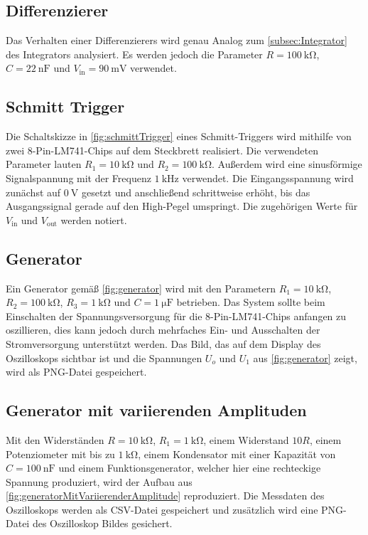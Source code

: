 \subsection{Differenzierer}
\label{subsec:Differenzierer}
Das Verhalten einer Differenzierers wird genau Analog zum \autoref{subsec:Integrator} des Integrators analysiert.
Es werden jedoch die Parameter $R = \qty{100}{\kilo\ohm}$, $ C = \qty{22}{\nano\farad}$ und $V_{\text{in}} = \qty{90}{\milli\volt}$ verwendet.

\subsection{Schmitt Trigger}
\label{subsec:SchmittTrigger}
Die Schaltskizze in \autoref{fig:schmittTrigger} eines Schmitt-Triggers wird mithilfe von zwei 8-Pin-LM741-Chips
auf dem Steckbrett realisiert. Die verwendeten Parameter lauten $R_1 = \qty{10}{\kilo\ohm}$ und $R_2 = \qty{100}{\kilo\ohm}$.
Außerdem wird eine sinusförmige Signalspannung mit der Frequenz $\qty{1}{\kilo\hertz}$ verwendet.
Die Eingangsspannung wird zunächst auf $\qty{0}{\volt}$ gesetzt und anschließend schrittweise erhöht,
bis das Ausgangssignal gerade auf den High-Pegel umspringt.
Die zugehörigen Werte für $V_\text{in}$ und $V_\text{out}$ werden notiert.

\subsection{Generator}
\label{subsec:Generator}
Ein Generator gemäß \autoref{fig:generator} wird mit den Parametern 
$R_1 = \qty{10}{\kilo\ohm}$, $R_2 = \qty{100}{\kilo\ohm}$, $R_3 = \qty{1}{\kilo\ohm}$ und $C = \qty{1}{\micro\farad}$ betrieben. 
Das System sollte beim Einschalten der Spannungsversorgung für die 8-Pin-LM741-Chips anfangen zu oszillieren,
dies kann jedoch durch mehrfaches Ein- und Ausschalten der Stromversorgung unterstützt werden. 
Das Bild, das auf dem Display des Oszilloskops sichtbar ist und die Spannungen $U_o$ und $U_1$ aus \ref{fig:generator} zeigt, 
wird als PNG-Datei gespeichert.

\subsection{Generator mit variierenden Amplituden}
\label{subsec:GeneratorMitVariierendenAmplituden}
Mit den Widerständen $R = \qty{10}{\kilo\ohm}$, $R_1 = \qty{1}{\kilo\ohm}$, einem Widerstand $10R$, einem Potenziometer mit bis zu $\qty{1}{\kilo\ohm}$, 
einem Kondensator mit einer Kapazität von $C = \qty{100}{\nano\farad}$ und einem Funktionsgenerator, welcher hier eine rechteckige Spannung produziert, 
wird der Aufbau aus \autoref{fig:generatorMitVariierenderAmplitude} reproduziert.
Die Messdaten des Oszilloskops werden als CSV-Datei gespeichert und zusätzlich wird eine PNG-Datei des Oszilloskop Bildes gesichert.
